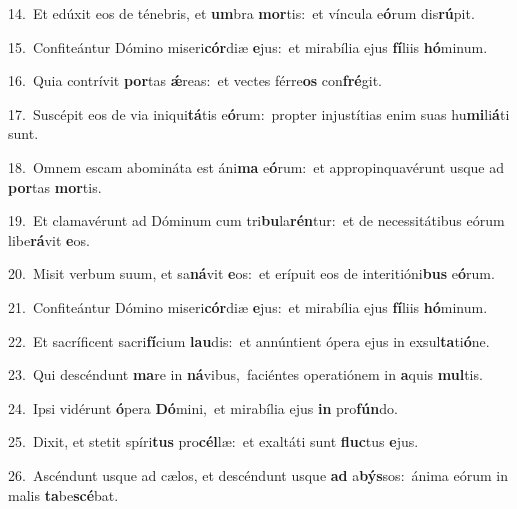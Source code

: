 {\numbfont\textcolor{\numbcolor}{14.}}~Et edúxit eos de ténebris, et \textbf{um}\-bra \textbf{mor}\-tis:~\star et víncula e\-\textbf{ó}\-rum dis\-\textbf{rú}\-pit.\par
{\numbfont\textcolor{\numbcolor}{15.}}~Confiteántur Dómino miseri\-\textbf{cór}\-diæ \textbf{e}\-jus:~\star et mirabília ejus \textbf{fí}\-liis \textbf{hó}\-minum.\par
{\numbfont\textcolor{\numbcolor}{16.}}~Quia contrívit \textbf{por}\-tas \textbf{ǽ}\-reas:~\star et vectes férre\textbf{os} con\-\textbf{fré}\-git.\par
{\numbfont\textcolor{\numbcolor}{17.}}~Suscépit eos de via iniqui\-\textbf{tá}\-tis e\-\textbf{ó}\-rum:~\star propter injustítias enim suas hu\-\textbf{mi}\-li\-\textbf{á}\-ti sunt.\par
{\numbfont\textcolor{\numbcolor}{18.}}~Omnem escam abomináta est áni\textbf{ma} e\-\textbf{ó}\-rum:~\star et appropinquavérunt usque ad \textbf{por}\-tas \textbf{mor}\-tis.\par
{\numbfont\textcolor{\numbcolor}{19.}}~Et clamavérunt ad Dóminum cum tri\-\textbf{bu}\-la\-\textbf{rén}\-tur:~\star et de necessitátibus eórum libe\-\textbf{rá}\-vit \textbf{e}\-os.\par
{\numbfont\textcolor{\numbcolor}{20.}}~Misit verbum suum, et sa\-\textbf{ná}\-vit \textbf{e}\-os:~\star et erípuit eos de interitióni\textbf{bus} e\-\textbf{ó}\-rum.\par
{\numbfont\textcolor{\numbcolor}{21.}}~Confiteántur Dómino miseri\-\textbf{cór}\-diæ \textbf{e}\-jus:~\star et mirabília ejus \textbf{fí}\-liis \textbf{hó}\-minum.\par
{\numbfont\textcolor{\numbcolor}{22.}}~Et sacríficent sacri\-\textbf{fí}\-cium \textbf{lau}\-dis:~\star et annúntient ópera ejus in exsul\-\textbf{ta}\-ti\-\textbf{ó}\-ne.\par
{\numbfont\textcolor{\numbcolor}{23.}}~Qui descéndunt \textbf{ma}\-re in \textbf{ná}\-vibus,~\star faciéntes operatiónem in \textbf{a}\-quis \textbf{mul}\-tis.\par
{\numbfont\textcolor{\numbcolor}{24.}}~Ipsi vidérunt \textbf{ó}\-pera \textbf{Dó}\-mini,~\star et mirabília ejus \textbf{in} pro\-\textbf{fún}\-do.\par
{\numbfont\textcolor{\numbcolor}{25.}}~Dixit, et stetit spíri\textbf{tus} pro\-\textbf{cél}\-læ:~\star et exaltáti sunt \textbf{fluc}\-tus \textbf{e}\-jus.\par
{\numbfont\textcolor{\numbcolor}{26.}}~Ascéndunt usque ad cælos, et descéndunt usque \textbf{ad} a\-\textbf{býs}\-sos:~\star ánima eórum in malis \textbf{ta}\-be\-\textbf{scé}\-bat.\par
